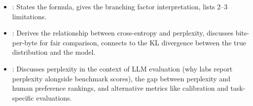 \begin{interviewq}
\goodgreat
\begin{itemize}
    \item {}: States the formula, gives the branching factor
          interpretation, lists 2--3 limitations.
    \item {}: Derives the relationship between cross-entropy and
          perplexity, discusses bits-per-byte for fair comparison, connects to
          the KL divergence between the true distribution and the model.
    \item {}: Discusses perplexity in the context of LLM
          evaluation (why labs report perplexity alongside benchmark scores),
          the gap between perplexity and human preference rankings, and
          alternative metrics like calibration and task-specific evaluations.
\end{itemize}

\end{interviewq}

\vspace{0.5em}

